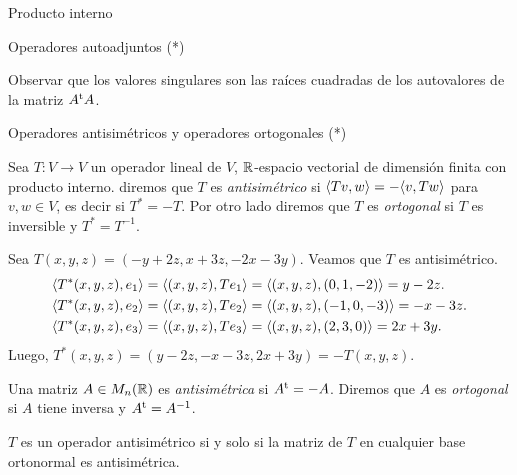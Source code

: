 \begin{chapter}{Producto interno}
\begin{section}{Operadores autoadjuntos (*)}
\begin{observacion*}
            Observar que los valores singulares son las raíces cuadradas de los autovalores de la matriz $A^{{\operatorname{t}}}A$. 
        \end{observacion*}
        
        
        
        
        \end{section}
        
        \begin{section}{Operadores antisim\'etricos y operadores ortogonales (*)}\label{seccion-operadores-antisimetrivos-y-ortogonales}
            
        \begin{definicion}
            Sea $T:V\to V$ un operador lineal de $V$,  $\mathbb R$-espacio vectorial de dimensión finita con producto interno. diremos que $T$  es \textit{antisimétrico} si $\langle Tv,w \rangle = -\langle v,Tw \rangle$ para $v,w \in V$,  es decir si $T^* = -T$. Por otro lado diremos que $T$ es \textit{ortogonal} si $T$ es inversible y $T^* = T^{-1}$. 
        \end{definicion}	
        
        \begin{ejemplo*}
            Sea $T(x,y,z) = (-y+2z,x+3z,-2x-3y)$. Veamos que $T$ es antisimétrico. 
            \begin{align*}
                \langle T^*(x,y,z),e_1 \rangle &= \langle (x,y,z), Te_1 \rangle = \langle (x,y,z),(0,1,-2) \rangle = y -2z. \\
                \langle T^*(x,y,z),e_2 \rangle &= \langle (x,y,z), Te_2 \rangle = \langle (x,y,z),(-1,0,-3) \rangle = -x -3z. \\	
                \langle T^*(x,y,z),e_3 \rangle &= \langle (x,y,z), Te_3 \rangle = \langle (x,y,z),(2,3,0) \rangle = 2x+3y. 
            \end{align*}
            Luego, $T^*(x,y,z) = (y-2z,-x-3z,2x+3y) = -T(x,y,z)$.	
        \end{ejemplo*}
            
        \begin{definicion}
            Una matriz  $A \in M_{n}(\mathbb R)$  es \textit{antisimétrica} si $A^{{\operatorname{t}}}= -A$. Diremos que  $A$  es \textit{ortogonal} si $A$ tiene inversa y $A^{{\operatorname{t}}}=A^{-1}$.
        \end{definicion}	
            
        \begin{ejercicio*} $T$  es un operador antisimétrico si y solo si la matriz de $T$ en cualquier base ortonormal es antisimétrica.
        

\end{ejercicio*}
\end{section}
\end{chapter}
